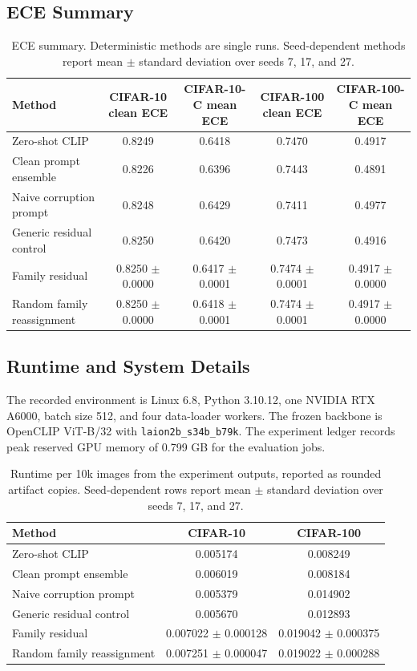 \documentclass{article}
\begin{document}
\subsection{ECE Summary}
\label{app:ece}

\begin{table}[h]
\caption{ECE summary. Deterministic methods are single runs. Seed-dependent methods report mean $\pm$ standard deviation over seeds 7, 17, and 27.}
\centering
\small
\begin{tabular}{lcccc}
\toprule
Method & CIFAR-10 clean ECE & CIFAR-10-C mean ECE & CIFAR-100 clean ECE & CIFAR-100-C mean ECE \\
\midrule
Zero-shot CLIP & 0.8249 & 0.6418 & 0.7470 & 0.4917 \\
Clean prompt ensemble & 0.8226 & 0.6396 & 0.7443 & 0.4891 \\
Naive corruption prompt & 0.8248 & 0.6429 & 0.7411 & 0.4977 \\
Generic residual control & 0.8250 & 0.6420 & 0.7473 & 0.4916 \\
Family residual & 0.8250 $\pm$ 0.0000 & 0.6417 $\pm$ 0.0001 & 0.7474 $\pm$ 0.0001 & 0.4917 $\pm$ 0.0000 \\
Random family reassignment & 0.8250 $\pm$ 0.0000 & 0.6418 $\pm$ 0.0001 & 0.7474 $\pm$ 0.0001 & 0.4917 $\pm$ 0.0000 \\
\bottomrule
\end{tabular}
\end{table}

\subsection{Runtime and System Details}

The recorded environment is Linux 6.8, Python 3.10.12, one NVIDIA RTX A6000, batch size 512, and four data-loader workers. The frozen backbone is OpenCLIP ViT-B/32 with \texttt{laion2b\_s34b\_b79k}. The experiment ledger records peak reserved GPU memory of 0.799 GB for the evaluation jobs.

\begin{table}[h]
\caption{Runtime per 10k images from the experiment outputs, reported as rounded artifact copies. Seed-dependent rows report mean $\pm$ standard deviation over seeds 7, 17, and 27.}
\label{tab:runtime_exact}
\centering
\small
\begin{tabular}{lcc}
\toprule
Method & CIFAR-10 & CIFAR-100 \\
\midrule
Zero-shot CLIP & 0.005174 & 0.008249 \\
Clean prompt ensemble & 0.006019 & 0.008184 \\
Naive corruption prompt & 0.005379 & 0.014902 \\
Generic residual control & 0.005670 & 0.012893 \\
Family residual & 0.007022 $\pm$ 0.000128 & 0.019042 $\pm$ 0.000375 \\
Random family reassignment & 0.007251 $\pm$ 0.000047 & 0.019022 $\pm$ 0.000288 \\
\bottomrule
\end{tabular}
\end{table}



\end{document}
